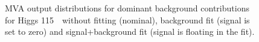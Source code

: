 \begin{figure}[!hbtp]
\caption{
MVA output distributions for dominant background contributions for
Higgs 115~\GeV\ without fitting (nominal), background fit (signal is
set to zero) and signal+background fit (signal is floating in the
fit).}
\label{fig:bdt2_115}
\end{figure}

